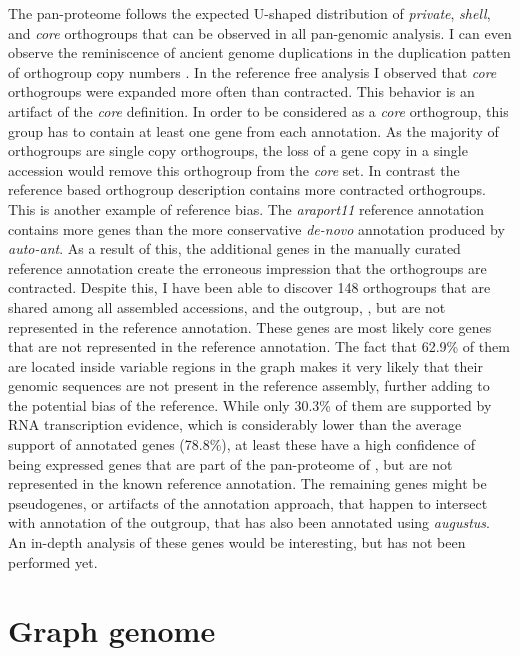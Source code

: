 The pan-proteome follows the expected U-shaped distribution of \textit{private}, \textit{shell}, and \textit{core} orthogroups that can be observed in all pan-genomic analysis. I can even observe the reminiscence of ancient genome duplications in the duplication patten of orthogroup copy numbers \citep{Simillion2002-ub,Del_Pozo2015-id}. In the reference free analysis I observed that \textit{core} orthogroups were expanded more often than contracted. This behavior is an artifact of the \textit{core} definition. In order to be considered as a \textit{core} orthogroup, this group has to contain at least one gene from each annotation. As the majority of orthogroups are single copy orthogroups, the loss of a gene copy in a single accession would remove this orthogroup from the \textit{core} set. In contrast the reference based orthogroup description contains more contracted orthogroups. This is another example of reference bias. \newline
The \textit{araport11} reference annotation \citep{Cheng2017-ah} contains more genes than the more conservative \textit{de-novo} annotation produced by \textit{auto-ant}. As a result of this, the additional genes in the manually curated reference annotation create the erroneous impression that the orthogroups are contracted. Despite this, I have been able to discover 148 orthogroups that are shared among all assembled accessions, and the outgroup, \ara, but are not represented in the reference annotation. These genes are most likely core genes that are not represented in the reference annotation. The fact that 62.9\% of them are located inside variable regions in the graph makes it very likely that their genomic sequences are not present in the reference assembly, further adding to the potential bias of the reference. While only 30.3\% of them are supported by RNA transcription evidence, which is considerably lower than the average support of annotated genes (78.8\%), at least these have a high confidence of being expressed genes that are part of the pan-proteome of \ath, but are not represented in the known reference annotation. The remaining genes might be pseudogenes, or artifacts of the annotation approach, that happen to intersect with annotation of the outgroup, that has also been annotated using \textit{augustus}. An in-depth analysis of these genes would be interesting, but has not been performed yet. 

\section{Graph genome}
\label{sec:graphConstructionDiscussion}

